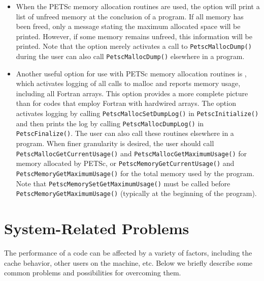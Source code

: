 {{\begin{itemize}
\item When the PETSc memory allocation routines are used, the option
 will print a list of unfreed memory at the conclusion of a
program.  If all memory has been freed, only a message stating
the maximum allocated space will be printed.  However, if some memory
remains unfreed, this information will be printed.  Note that the
option  merely activates a call to \lstinline{PetscMallocDump()} during
 the user can also call \lstinline{PetscMallocDump()} elsewhere
in a program.

\item Another useful option for use with PETSc memory allocation
routines is , which activates logging of all calls
to malloc and reports memory usage, including all Fortran arrays.
This option provides a more complete picture than  for
codes that employ Fortran with hardwired arrays.  The option
 activates logging by calling \lstinline{PetscMallocSetDumpLog()} in
\lstinline{PetscInitialize()} and then prints the log by calling \lstinline{PetscMallocDumpLog()}
in \lstinline{PetscFinalize()}.  The user can also call these routines elsewhere in a
program.  When finer granularity is desired, the user should call
\break\lstinline{PetscMallocGetCurrentUsage()} and \lstinline{PetscMallocGetMaximumUsage()} for memory
allocated by PETSc, or \break\lstinline{PetscMemoryGetCurrentUsage()} and
\lstinline{PetscMemoryGetMaximumUsage()} for the total memory used by the program.
Note that \lstinline{PetscMemorySetGetMaximumUsage()} must be called before
\lstinline{PetscMemoryGetMaximumUsage()} (typically at the beginning of the program).
\end{itemize}

\section{System-Related Problems}

The performance of a code can be affected by a variety of factors,
including the cache behavior, other users on the machine, etc.
Below we briefly describe some common problems and possibilities for
overcoming them.

}}
